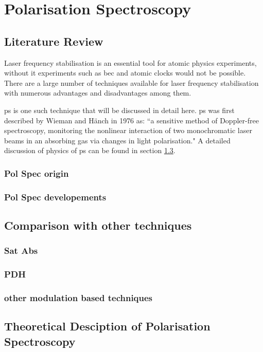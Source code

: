 \chapter{Polarisation Spectroscopy}
\setcounter{page}{1}

\section{Literature Review}

Laser frequency stabilisation is an essential tool for atomic physics experiments, without it experiments such as \gls{bec} and atomic clocks would not be possible.
There are a large number of techniques available for laser frequency stabilisation with numerous advantages and disadvantages among them.

\Gls{ps} is one such technique that will be discussed in detail here.
\Gls{ps} was first described by Wieman and H\"anch in 1976 as: ``a sensitive method of Doppler-free spectroscopy, monitoring the nonlinear interaction of two monochromatic laser beams in an absorbing gas via changes in light polarisation."\cite{wieman_doppler-free_1976}
A detailed discussion of physics of \gls{ps} can be found in section \ref{section:pol_spec_theory}.

\subsection{Pol Spec origin}
\subsection{Pol Spec developements}
\section{Comparison with other techniques}
\subsection{Sat Abs}
\subsection{PDH}
\subsection{other modulation based techniques}
\section{Theoretical Desciption of Polarisation Spectroscopy}\label{section:pol_spec_theory}

